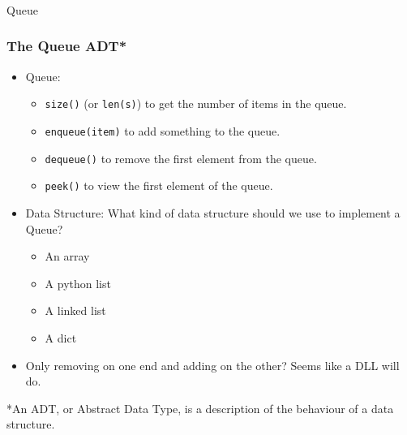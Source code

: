 \begin{frame}[fragile]\frametitle{}
\begin{center}
{\Large Queue}
\end{center}

\end{frame}

\begin{frame}
	\frametitle{The Queue ADT*}
	
			\begin{itemize}

				\item Queue:
								\begin{itemize}

				\item \texttt{size()} (or \texttt{len(s)}) to get the number of items in the queue.
				\item \texttt{enqueue(item)} to add something to the queue.
				\item \texttt{dequeue()} to remove the first element from the queue.
				\item \texttt{peek()} to view the first element of the queue.
			\end{itemize}
			\item Data Structure:
			What kind of data structure should we use to implement a Queue?
				\begin{itemize}
					\item An array
					\item A python list
					\item A linked list
					\item A dict
				\end{itemize}
			\item 
			Only removing on one end and adding on the other? Seems like a DLL will do.
				\end{itemize}

						{*\scriptsize An ADT, or Abstract Data Type, is a description of the behaviour of a data structure.}
\end{frame}

